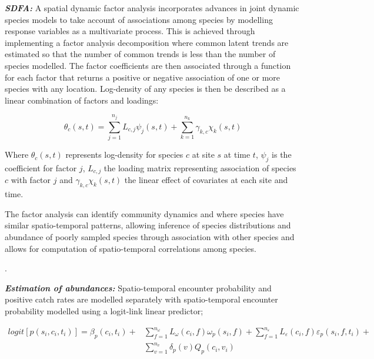 \documentclass[12pt]{article}
\begin{document}
\begin{linenumbers}
\textbf{\textit{SDFA:}} A spatial dynamic factor analysis incorporates advances
in joint dynamic species models\cite{Thorson2017} to take account of
associations among species by modelling response variables as a multivariate
process. This is achieved through implementing a factor analysis decomposition
where common latent trends are estimated so that the number of common trends is
less than the number of species modelled. The factor coefficients are then
associated through a function for each factor that returns a positive or
negative association of one or more species with any location. Log-density of
any species is then be described as a linear combination of factors and
loadings: 

\begin{equation} \theta_{c}(s,t) = \sum_{j=1}^{n_{j}}
	L_{c,j}\psi_{j}(s,t) +\sum_{k=1}^{n_{k}} \gamma_{k,c}\chi_{k}(s,t)
\end{equation} 

Where $\theta_{c}(s,t)$ represents log-density for species $c$
at site $s$ at time $t$, $\psi_{j}$ is the coefficient for factor $j$,
$L_{c,j}$ the loading matrix representing association of species $c$ with
factor $j$ and $\gamma_{k,c}\chi_{k}(s,t)$ the linear effect of covariates at
each site and time\cite{Thorson2016b}. 

The factor analysis can identify community dynamics and where species have
similar spatio-temporal patterns, allowing inference of species distributions
and abundance of poorly sampled species through association with other species
and allows for computation of spatio-temporal correlations among
species\cite{Thorson2016b}.

. 

\textbf{\textit{Estimation of abundances:}} Spatio-temporal encounter
probability and positive catch rates are modelled separately with
spatio-temporal encounter probability modelled using a logit-link linear
predictor;

		\begin{equation}
			\begin{split}
			logit[p(s_{i},c_{i},t_{i})] =	\beta_{p}(c_{i},t_{i}) +
			& \sum\limits_{f=1}^{n_{\omega}} L_{\omega}(c_{i},f)
			\omega_{p}(s_{i},f) + \sum\limits_{f=1}^{n_{\varepsilon}}
			L_{\varepsilon}(c_{i},f) \varepsilon_{p}(s_{i},f,t_{i}) + \\ 
			& \sum\limits_{v=1}^{n_{v}}\delta_{p}(v)Q_{p}(c_{i}, v_{i})
		\end{split}
		\end{equation}


\end{linenumbers}
\end{document}
